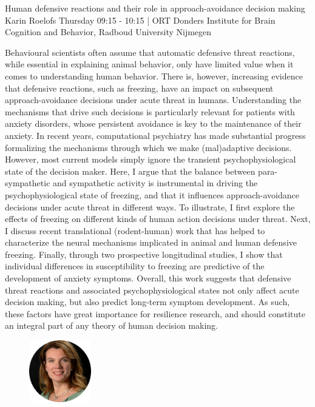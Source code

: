 
\begin{keynote}
    {Human defensive reactions and their role in approach-avoidance decision making}
    {Karin Roelofs}
    {Thursday 09:15 - 10:15 | ORT}
    {Donders Institute for Brain Cognition and Behavior, Radboud University Nijmegen}

    Behavioural scientists often assume that automatic defensive threat reactions, while essential in explaining animal behavior, only have limited value when it comes to understanding human behavior. There is, however, increasing evidence that defensive reactions, such as freezing, have an impact on subsequent approach-avoidance decisions under acute threat in humans. Understanding the mechanisms that drive such decisions is particularly relevant for patients with anxiety disorders, whose persistent avoidance is key to the maintenance of their anxiety. In recent years, computational psychiatry has made substantial progress formalizing the mechanisms through which we make (mal)adaptive decisions. However, most current models simply ignore the transient psychophysiological state of the decision maker. Here, I argue that the balance between para-sympathetic and sympathetic activity is instrumental in driving the psychophysiological state of freezing, and that it influences approach-avoidance decisions under acute threat in different ways. To illustrate, I first explore the effects of freezing on different kinds of human action decisions under threat. Next, I discuss recent translational (rodent-human) work that has helped to characterize the neural mechanisms implicated in animal and human defensive freezing. Finally, through two prospective longitudinal studies, I show that individual differences in susceptibility to freezing are predictive of the development of anxiety symptoms. 
    Overall, this work suggests that defensive threat reactions and associated psychophysiological states not only affect acute decision making, but also predict long-term symptom development. As such, these factors have great importance for resilience research, and should constitute an integral part of any theory of human decision making.


    \begin{figure}[H]
        \raggedleft
        \includegraphics[width=0.24\textwidth]{tex/images/keynote_speaker/roeloefs_cropped.png}
    \end{figure}

\end{keynote}
